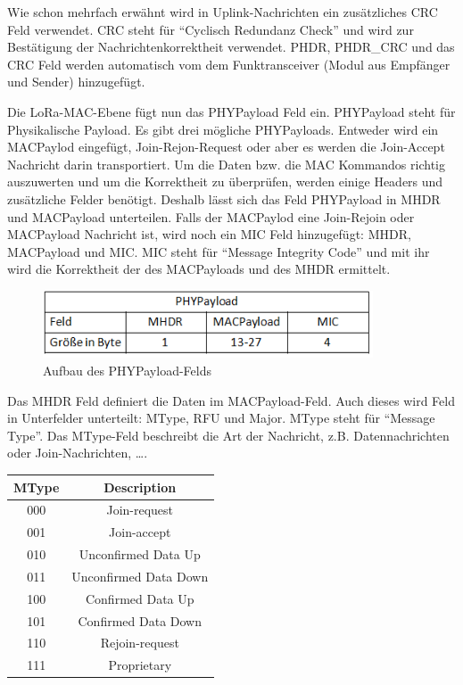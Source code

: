 \documentclass[a4paper, 12pt]{article}
\begin{document}
                Wie schon mehrfach erwähnt wird in Uplink-Nachrichten ein zusätzliches CRC Feld verwendet. CRC steht für 
                ``Cyclisch Redundanz Check'' und wird zur Bestätigung der Nachrichtenkorrektheit verwendet. 
                PHDR, PHDR\_CRC 
                und das CRC Feld werden automatisch vom dem Funktransceiver (Modul aus Empfänger und Sender) hinzugefügt.

                Die LoRa-MAC-Ebene fügt nun das PHYPayload Feld ein. PHYPayload steht für Physikalische Payload. 
                Es gibt drei mögliche PHYPayloads. Entweder wird ein MACPaylod eingefügt, Join-Rejon-Request oder aber 
                es werden die Join-Accept Nachricht darin transportiert. Um die Daten bzw. die MAC Kommandos richtig auszuwerten 
                und um die Korrektheit zu überprüfen, werden einige Headers und zusätzliche Felder benötigt. 
                Deshalb lässt sich das Feld PHYPayload in MHDR und MACPayload unterteilen. Falls der 
                MACPaylod eine Join-Rejoin oder MACPayload Nachricht ist, wird noch ein MIC 
                Feld hinzugefügt: MHDR, MACPayload und MIC. MIC steht für ``Message Integrity Code'' und mit ihr wird 
                die Korrektheit der des MACPayloads und des MHDR ermittelt.

                \begin{figure}[ht]
                    \centering
                    \includegraphics[height=2cm]{PHYPayload}
                    \caption{Aufbau des PHYPayload-Felds}
                \end{figure}

                Das MHDR Feld definiert die Daten im MACPayload-Feld. Auch dieses wird Feld in 
                Unterfelder unterteilt: MType, RFU und Major. MType steht für ``Message Type''. Das MType-Feld beschreibt die Art der 
                Nachricht, z.B. Datennachrichten oder Join-Nachrichten, \dots. 

                \begin{longtable}{c |c }
                    \centering
                    MType & Description  \\
                    \hline
                    000 & Join-request \\
                    001 & Join-accept \\
                    010 & Unconfirmed Data Up \\
                    011 & Unconfirmed Data Down \\
                    100 & Confirmed Data Up \\
                    101 & Confirmed Data Down \\
                    110 & Rejoin-request \\
                    111 & Proprietary \\
                \end{longtable}
\end{document}
